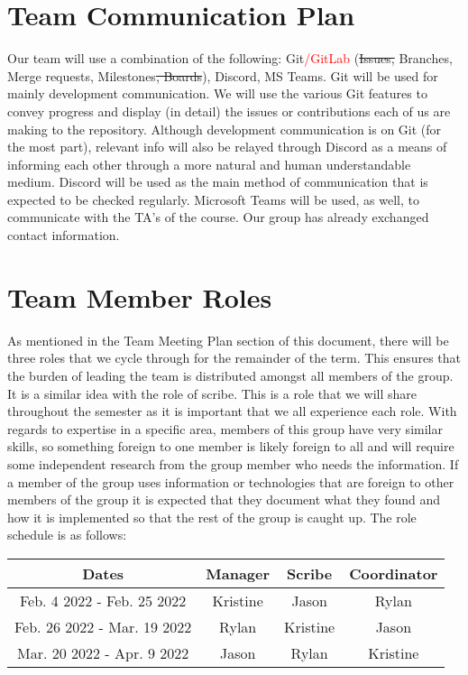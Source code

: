 \documentclass{article}
\begin{document}
\section{Team Communication Plan}

Our team will use a combination of the following: Git\textcolor{red}{/GitLab} (\st{Issues, }Branches, Merge requests, Milestones\st{, Boards}), Discord, MS Teams. Git will be used for mainly development communication. We will use the various Git features to convey progress and display (in detail) the issues or contributions each of us are making to the repository. Although development communication is on Git (for the most part), relevant info will also be relayed through Discord as a means of informing each other through a more natural and human understandable medium. Discord will be used as the main method of communication that is expected to be checked regularly. Microsoft Teams will be used, as well, to communicate with the TA’s of the course. Our group has already exchanged contact information.

\section{Team Member Roles}

As mentioned in the Team Meeting Plan section of this document, there will be three roles that we cycle through for the remainder of the term. This ensures that the burden of leading the team is distributed amongst all members of the group. It is a similar idea with the role of scribe. This is a role that we will share throughout the semester as it is important that we all experience each role. With regards to expertise in a specific area, members of this group have very similar skills, so something foreign to one member is likely foreign to all and will require some independent research from the group member who needs the information. If a member of the group uses information or technologies that are foreign to other members of the group it is expected that they document what they found and how it is implemented so that the rest of the group is caught up. The role schedule is as follows:

\begin{center}
\begin{tabular}{|c|c|c|c|} 
 \hline
 Dates & Manager & Scribe & Coordinator \\ [0.5ex] 
 \hline\hline
 Feb. 4 2022 - Feb. 25 2022 & Kristine & Jason & Rylan \\ 
 \hline
 Feb. 26 2022 - Mar. 19 2022 & Rylan & Kristine & Jason \\
 \hline
 Mar. 20 2022 - Apr. 9 2022 & Jason & Rylan & Kristine \\
 \hline
\end{tabular}
\end{center}
\end{document}
